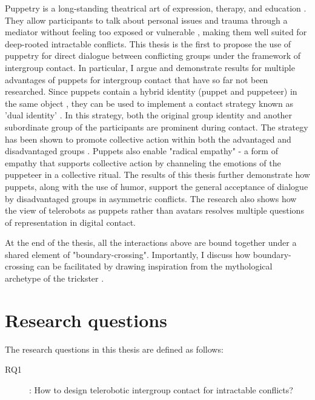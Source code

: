 \documentclass[dissertation,math,vertlayout,pdfa,colorlinks,nologo]{aaltoseries}
\begin{document}
Puppetry is a long-standing theatrical art of expression, therapy, and education \cite{krogerPuppetPedagogicalTool2019}. They allow participants to talk about personal issues and trauma through a mediator without feeling too exposed or vulnerable \cite{purcell-gatesAppliedPuppetryCommunities2020}, making them well suited for deep-rooted intractable conflicts. This thesis is the first to propose the use of puppetry for direct dialogue between conflicting groups under the framework of intergroup contact. In particular, I argue and demonstrate results for multiple advantages of puppets for intergroup contact that have so far not been researched. Since puppets contain a hybrid identity (puppet and puppeteer) in the same object \cite{wisniewskaHybridityPuppetry2020}, they can be used to implement a contact strategy known as 'dual identity' \cite{gaertnerCategorizationRecategorizationIntergroup2005}. In this strategy,  both the original group identity and another subordinate group of the participants are prominent during contact. The strategy has been shown to promote collective action within both the advantaged and disadvantaged groups \cite{hasslerIntergroupContactSocial2021}. Puppets also enable "radical empathy" \cite{astlesWalkWalkMy2020} - a form of empathy that supports collective action by channeling the emotions of the puppeteer in a collective ritual. The results of this thesis further demonstrate how puppets, along with the use of humor, support the general acceptance of dialogue by disadvantaged groups in asymmetric conflicts. The research also shows how the view of telerobots as puppets rather than avatars resolves multiple questions of representation in digital contact.

At the end of the thesis, all the interactions above are bound together under a shared element of "boundary-crossing". Importantly, I discuss how boundary-crossing can be facilitated by drawing inspiration from the mythological archetype of the trickster \cite{hydeTricksterMakesThis1997}.

\section{Research questions}
The research questions in this thesis are defined as follows:

\begin{description}
\item[RQ1]: How to design telerobotic intergroup contact for intractable conflicts?
\end{description}
\end{document}

